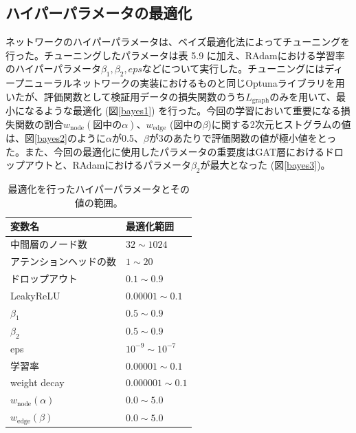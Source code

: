 \subsection{ハイパーパラメータの最適化}
ネットワークのハイパーパラメータは、ベイズ最適化法によってチューニングを行った。チューニングしたパラメータは表 5.9%
に加え、RAdamにおける学習率のハイパーパラメータ$\beta_1, \beta_2, eps$などについて実行した。チューニングにはディープニューラルネットワークの実装におけるものと同じOptunaライブラリを用いたが、評価関数として検証用データの損失関数のうち$ L_\mathrm{{graph}}$のみを用いて、最小になるような最適化 (図\ref{bayes1}) を行った。今回の学習において重要になる損失関数の割合$w_{\mathrm{node}} (図中の\alpha)$、$w_{\mathrm{edge}}$ (図中の$\beta$)に関する2次元ヒストグラムの値は、図\ref{bayes2}のように$\alpha$が0.5、$\beta$が3のあたりで評価関数の値が極小値をとった。また、今回の最適化に使用したパラメータの重要度はGAT層におけるドロップアウトと、RAdamにおけるパラメータ$\beta_2$が最大となった (図\ref{bayes3})。
\begin{table}[H]
\centering
 \begin{tabular}{ l  l }
 \hline
 変数名 & 最適化範囲\\
 \hline
 \hline
 中間層のノード数 & $32 \sim 1024$\\
 アテンションヘッドの数 & $1 \sim 20$\\
 ドロップアウト & $0.1 \sim 0.9$\\
 LeakyReLU & $0.00001 \sim 0.1$\\
 $\beta_1$ & $0.5 \sim 0.9$\\ 
 $\beta_2$ & $0.5 \sim 0.9$\\ 
 eps & $10^{-9} \sim 10^{-7}$\\
 学習率 & $0.00001 \sim 0.1$\\
 weight decay & $0.000001 \sim 0.1$\\
 $w_{\mathrm{node}}(\alpha)$ & $0.0 \sim 5.0$\\
 $w_{\mathrm{edge}}(\beta)$ & $0.0 \sim 5.0$\\
  \hline
 \end{tabular}
 \label{gnnoptuna}
 \caption{最適化を行ったハイパーパラメータとその値の範囲。}
\end{table}

